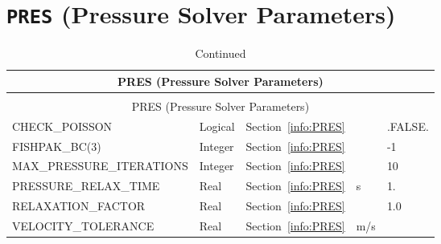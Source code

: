 \documentclass[11pt]{book}
\begin{document}
\vspace{\baselineskip}

\section{\texorpdfstring{{\tt PRES}}{PRES} (Pressure Solver Parameters)}

\begin{longtable}{@{\extracolsep{\fill}}|l|l|l|l|l|}
\caption[Pressure solver parameters ({\ct PRES} namelist group)]{For more information see Section~\ref{info:PRES}.}
\label{tbl:PRES} \\
\hline
\multicolumn{5}{|c|}{{\ct PRES} (Pressure Solver Parameters)} \\
\hline \hline
\endfirsthead
\caption[]{Continued} \\
\hline
\multicolumn{5}{|c|}{{\ct PRES} (Pressure Solver Parameters)} \\
\hline \hline
\endhead
{\ct CHECK\_POISSON}                & Logical       & Section~\ref{info:PRES}           &               & {\ct .FALSE.}             \\ \hline
{\ct FISHPAK\_BC(3)}                 & Integer       & Section~\ref{info:PRES}           &               & -1                        \\ \hline
{\ct MAX\_PRESSURE\_ITERATIONS}     & Integer       & Section~\ref{info:PRES}           &               &   10                      \\ \hline
{\ct PRESSURE\_RELAX\_TIME}         & Real          & Section~\ref{info:PRES}           & s             & 1.                        \\ \hline
{\ct RELAXATION\_FACTOR}            & Real          & Section~\ref{info:PRES}           &               & 1.0                       \\ \hline
{\ct VELOCITY\_TOLERANCE}           & Real          & Section~\ref{info:PRES}           &  m/s          &                           \\ \hline
\end{longtable}

\end{document}
